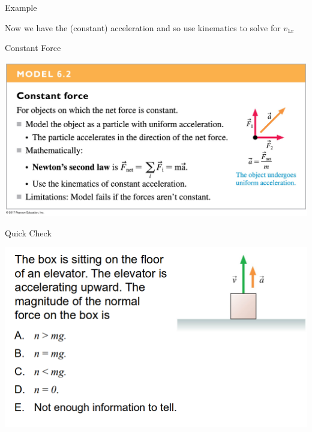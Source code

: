 \documentclass{beamer}
\newcommand{\red}[1]{{\color{red}{#1}}}
\newcommand{\checkL}[2]{\begin{textblock*}{1cm}(#1,#2){\Large \red{\Checkmark}}\end{textblock*}}
\begin{document}
\begin{frame}{Example}
\begin{center}
   Now we have the (constant) acceleration and so use kinematics to solve for $v_{1x}$
\end{center}
\end{frame}

\begin{frame}{Constant Force}
\begin{center}
   \includegraphics[width=\textwidth]{../figures/06_ModelBox_02.jpg}
\end{center}
\end{frame}

\begin{frame}{Quick Check}
\begin{center}
   \includegraphics[width=\textwidth]{../figures/QC6_6.png}
\end{center}
\only<2>{\checkL{1.0cm}{4.4cm}}
\end{frame}
\end{document}
